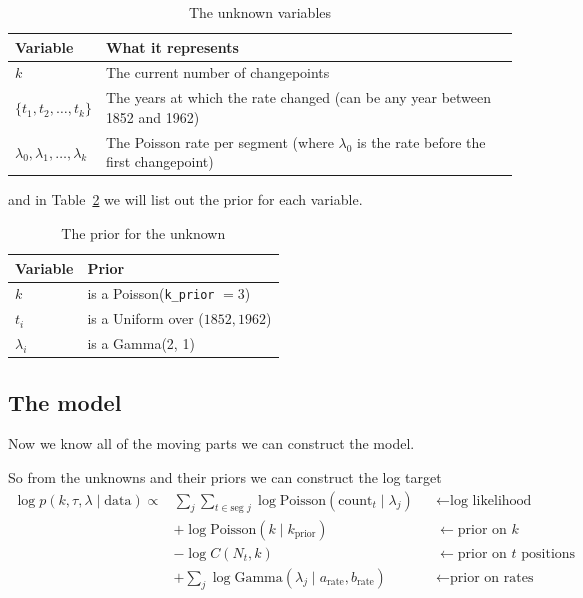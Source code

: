 \documentclass[10pt]{article}
\begin{document}
\begin{table}[ht]
\centering
\caption{The unknown variables}
\label{tab:changepoints}
\begin{tabular}{|l|l|}
\hline
\textbf{Variable} & \textbf{What it represents} \\ \hline
$k$ & The current number of changepoints \\ \hline
$\{t_1, t_2, \dots, t_k \}$ & The years at which the rate changed (can be any year between 1852 and 1962) \\ \hline
$\lambda_0, \lambda_1, \dots, \lambda_k$ & The Poisson rate per segment (where $\lambda_0$ is the rate before the first changepoint) \\ \hline
\end{tabular}
\end{table}


and in Table~\ref{tab:Prior} we will list out the prior for each variable.  


\begin{table}[ht]
\centering
\caption{The prior for the unknown}
\label{tab:Prior}
\begin{tabular}{|l|l|}
\hline
\textbf{Variable} & \textbf{Prior} \\ \hline
$k$ & is a Poisson(\texttt{k\_prior} $= 3$) \\ \hline
$t_i$ & is a Uniform over ($1852, 1962$) \\ \hline
$\lambda_i$ & is a Gamma(2, 1)\\ \hline
\end{tabular}
\end{table}

\subsection{The model}
Now we know all of the moving parts we can construct the model.

So from the unknowns and their priors we can construct the log target \begin{align*}
\log p(k, \tau, \lambda \mid \text{data}) \propto 
& \sum_{j} \sum_{t \in \text{seg } j} \log \text{Poisson}(\text{count}_t \mid \lambda_j) && \leftarrow \text{log likelihood} \\
& + \log \text{Poisson}(k \mid k_{\text{prior}}) && \leftarrow \text{prior on } k \\
& - \log C(N_t, k) && \leftarrow \text{prior on } t \text{ positions} \\
& + \sum_{j} \log \text{Gamma}(\lambda_j \mid a_{\text{rate}}, b_{\text{rate}}) && \leftarrow \text{prior on rates}
\end{align*}
\end{document}

